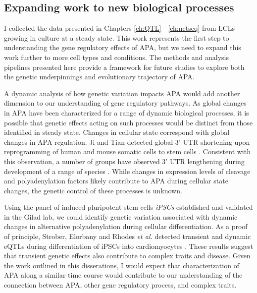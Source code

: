 \subsection{Expanding work to new biological processes}

I collected the data presented in Chapters \ref{ch:QTL} - \ref{ch:netseq} from LCLs growing in culture at a steady state. This work represents the first step to understanding the gene regulatory effects of APA, but we need to expand this work further to more cell types and conditions. The methods and analysis pipelines presented here provide a framework for future studies to explore both the genetic underpinnings and evolutionary trajectory of APA. 

A dynamic analysis of how genetic variation impacts APA would add another dimension to our understanding of gene regulatory pathways. As global changes in APA have been characterized for a range of dynamic biological processes, it is possible that genetic effects acting on such processes would be distinct from those identified in steady state. Changes in cellular state correspond with global changes in APA regulation. Ji and Tian detected global 3' UTR shortening upon reprogramming of human and mouse somatic cells to stem cells \citep{ji_progressive_2009}. Consistent with this observation, a number of groups have observed 3' UTR lengthening during development of a range of species \citep{ji_progressive_2009, hilgers_neural-specific_2011, li_dynamic_2012, mueller_alls_2013}. While changes in expression levels of cleavage and polyadenylation factors likely contribute to APA during cellular state changes, the genetic control of these processes is unknown. 

Using the panel of induced pluripotent stem cells \emph{iPSCs} established and validated in the Gilad lab, we could identify genetic variation associated with dynamic changes in alternative polyadenylation during cellular differentiation. As a proof of principle, Strober, Elorbany and Rhodes \emph{et al.} detected transient and dynamic eQTLs during differentiation of iPSCs into cardiomyocytes \citep{strober_dynamic_2019}. These results suggest that transient genetic effects also contribute to complex traits and disease. Given the work outlined in this disserations, I would expect that characterization of APA along a similar time course would contribute to our understanding of the connection between APA, other gene regulatory process, and complex traits.

